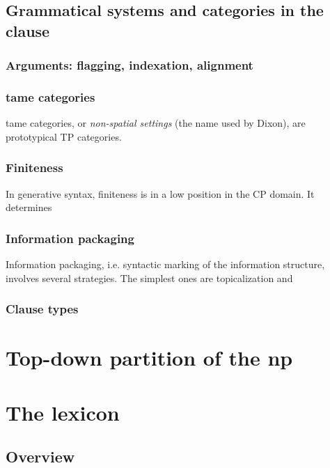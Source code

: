 \documentclass[UTF8, a4paper, oneside, scheme=plain]{ctexart}
\newcommand*{\term}[1]{\emph{#1}}
\begin{document}
\subsection{Grammatical systems and categories in the clause}

\subsubsection{Arguments: flagging, indexation, alignment}

\subsubsection{\ac{tame} categories}

\ac{tame} categories, or \term{non-spatial settings} (the name used by Dixon),
are prototypical TP categories.

\subsubsection{Finiteness}

In generative syntax, finiteness is in a low position in the CP domain.
It determines  

\subsubsection{Information packaging}

Information packaging, i.e. syntactic marking of the information structure,
involves several strategies.
The simplest ones are topicalization and 

\subsubsection{Clause types}



\section{Top-down partition of the \acl{np}}\label{sec:np-top-down}

\section{The lexicon}\label{sec:lexicon}

\subsection{Overview}
\end{document}
